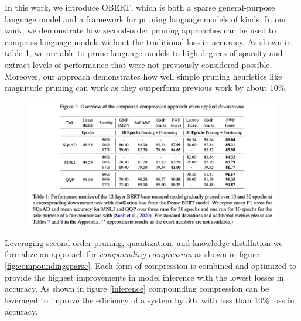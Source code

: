 In this work, we introduce OBERT, which is both a sparse general-purpose language model and a framework for pruning language models of kinds. In our work, we demonstrate how second-order pruning approaches can be used to compress language models without the traditional loss in accuracy. As shown in table \ref{fig:obert-perf}, we are able to prune language models to high degrees of sparsity and extract levels of performance that were not previously considered possible.  Moreover, our approach demonstrates how well simple pruning heuristics like magnitude pruning can work as they outperform previous work by about 10\%. \\
\begin{figure}[!htb]
    \centering
    \includegraphics[scale=0.75]{media/OBERTA-Perf.png}
    \vspace{-1em}
    \label{fig:obert-perf}
\end{figure}
Leveraging second-order pruning, quantization, and knowledge distillation we formalize an approach for \textit{compounding compression} as shown in figure \ref{fig:compoundingsparse}. Each form of compression is combined and optimized to provide the highest improvements in model inference with the lowest losses in accuracy. As shown in figure \ref{inference} compounding compression can be leveraged to improve the efficiency of a system by 30x with less than 10\% loss in accuracy. 
